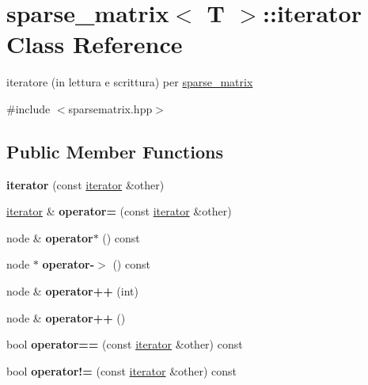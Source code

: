\hypertarget{classsparse__matrix_1_1iterator}{}\section{sparse\+\_\+matrix$<$ T $>$\+:\+:iterator Class Reference}
\label{classsparse__matrix_1_1iterator}


iteratore (in lettura e scrittura) per \hyperlink{classsparse__matrix}{sparse\+\_\+matrix}  




{\ttfamily \#include $<$sparsematrix.\+hpp$>$}

\subsection*{Public Member Functions}
\begin{DoxyCompactItemize}
\item 
\mbox{\label{classsparse__matrix_1_1iterator_aadf36980c7ea8e61568ebe84ea390ba6}} 
{\bfseries iterator} (const \hyperlink{classsparse__matrix_1_1iterator}{iterator} \&other)
\item 
\mbox{\label{classsparse__matrix_1_1iterator_a39b95af617e3f2973806431d2f49772f}} 
\hyperlink{classsparse__matrix_1_1iterator}{iterator} \& {\bfseries operator=} (const \hyperlink{classsparse__matrix_1_1iterator}{iterator} \&other)
\item 
\mbox{\label{classsparse__matrix_1_1iterator_a1ca5231e413e1eb82086ba071e2859c0}} 
node \& {\bfseries operator$\ast$} () const
\item 
\mbox{\label{classsparse__matrix_1_1iterator_ad8fcd1969cb111941351c4a837680132}} 
node $\ast$ {\bfseries operator-\/$>$} () const
\item 
\mbox{\label{classsparse__matrix_1_1iterator_ac6086d6984a11d59e515e638a4b7391f}} 
node \& {\bfseries operator++} (int)
\item 
\mbox{\label{classsparse__matrix_1_1iterator_a8344b8c3e23e0c3c884fbedab926be70}} 
node \& {\bfseries operator++} ()
\item 
\mbox{\label{classsparse__matrix_1_1iterator_ad54ad89b2982d7c519d29704f54ad487}} 
bool {\bfseries operator==} (const \hyperlink{classsparse__matrix_1_1iterator}{iterator} \&other) const
\item 
\mbox{\label{classsparse__matrix_1_1iterator_a598a2a1ff5789625a15567f5d4300a09}} 
bool {\bfseries operator!=} (const \hyperlink{classsparse__matrix_1_1iterator}{iterator} \&other) const
\end{DoxyCompactItemize}
